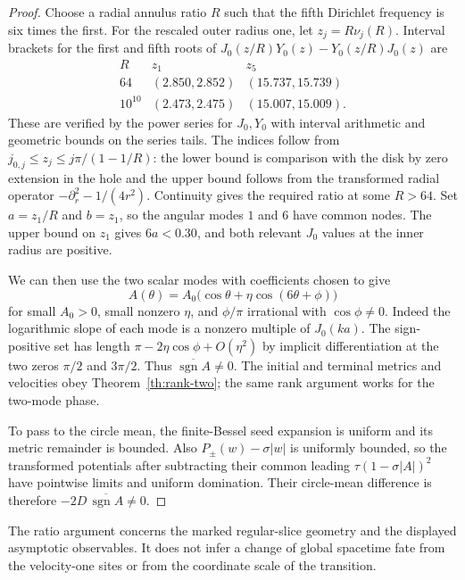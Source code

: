 \begin{proof}
Choose a radial annulus ratio $R$ such that the fifth
Dirichlet frequency is six times the first.
For the rescaled outer radius one, let $z_j=R\nu_j(R)$.
Interval brackets for the first and fifth roots of
$J_0(z/R)Y_0(z)-Y_0(z/R)J_0(z)$ are
\[
\begin{array}{c|cc}
 R & z_1 & z_5\\ \hline
64 & (2.850,2.852) & (15.737,15.739)\\
10^{10} & (2.473,2.475) & (15.007,15.009).
\end{array}
\]
These are verified by the power series for $J_0,Y_0$
with interval arithmetic and geometric bounds on the
series tails. The indices follow from
$j_{0,j}\le z_j\le j\pi/(1-1/R)$:
the lower bound is comparison with the disk by zero
extension in the hole and the upper bound follows
from the transformed radial operator
$-\partial_r^2-1/(4r^2)$.
Continuity gives the required ratio at some $R>64$.
Set $a=z_1/R$ and $b=z_1$, so the angular modes
$1$ and $6$ have common nodes. The upper bound on $z_1$
gives $6a<0.30$, and both relevant $J_0$ values at the
inner radius are positive.

We can then use the two scalar modes with coefficients
chosen to give
\[
 A(\theta)=A_0\big(\cos\theta+\eta\cos(6\theta+\phi)\big)
\]
for small $A_0>0$, small nonzero $\eta$, and
$\phi/\pi$ irrational with $\cos\phi\ne0$.
Indeed the logarithmic slope of each mode is a nonzero
multiple of $J_0(ka)$. The sign-positive set has
length $\pi-2\eta\cos\phi+O(\eta^2)$ by
implicit differentiation at the two zeros
$\pi/2$ and $3\pi/2$. Thus
$\overline{\operatorname{sgn}A}\ne0$.
The initial and terminal metrics and velocities
obey Theorem~\ref{th:rank-two}; the same rank
argument works for the two-mode phase.

To pass to the circle mean, the finite-Bessel seed
expansion is uniform and its metric remainder is bounded.
Also $P_\pm(w)-\sigma|w|$ is uniformly bounded,
so the transformed potentials after subtracting their
common leading $\tau(1-\sigma|A|)^2$ have pointwise
limits and uniform domination. Their circle-mean
difference is therefore
$-2D\,\overline{\operatorname{sgn}A}\ne0$.
\end{proof}

The ratio argument concerns the marked regular-slice
geometry and the displayed asymptotic observables.
It does not infer a change of global spacetime fate
from the velocity-one sites or from the coordinate scale
of the transition.
